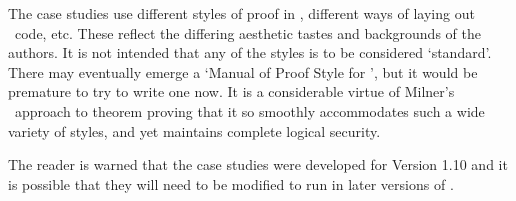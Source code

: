 The case studies use different styles of proof in \HOL, different ways of
laying out \ML\ code, etc. These reflect the differing aesthetic tastes and
backgrounds of the authors. It is not intended that any of the styles is to be
considered `standard'.  There may eventually emerge a `Manual of Proof Style
for \HOL', but it would be premature to try to write one now. It is a
considerable virtue of Milner's \LCF\ approach to theorem proving that it so
smoothly accommodates such a wide variety of styles, and yet maintains complete
logical security.

The reader is warned that the case studies were developed for  Version
1.10 and it is possible that they will need to be modified to run in later
versions of \HOL.












